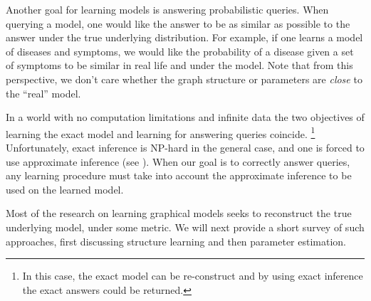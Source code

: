 
Another goal for learning models %
is answering probabilistic queries.
When querying a model, one would like the answer to be as similar as possible to the answer under the true underlying distribution.
For example, if one learns a model of diseases and symptoms, we would like the probability of a disease given a set of symptoms to be similar in real life and under the model.
Note that from this perspective, we don't care whether the graph structure or parameters are {\em close} to the ``real'' model. 


In a world with no computation limitations and infinite data the two objectives of learning the exact model and learning for answering queries coincide.
\footnote{In this case, the exact model can be re-construct and by using exact inference the exact answers could be returned.}
Unfortunately, exact inference is NP-hard in the general case, and one is forced to use approximate inference (see ).
When our goal is to correctly answer queries, any learning procedure must take into account the approximate inference to be used on the learned model.



Most of the research on learning graphical models seeks to reconstruct the true underlying model, under some metric. We will next provide a short survey of such approaches, first discussing structure learning and then parameter estimation.



